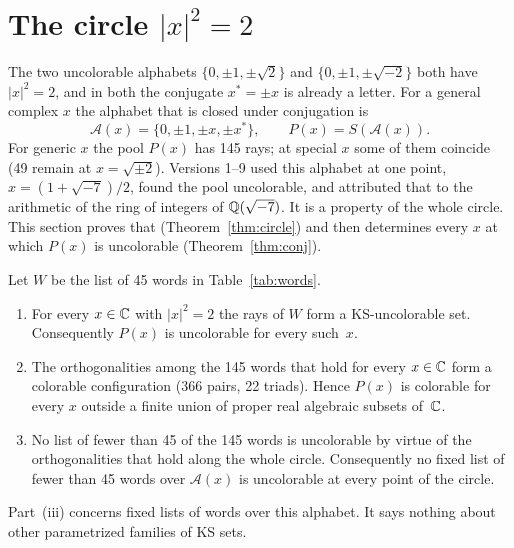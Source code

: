 \section{The circle $|x|^2=2$}\label{sec:circle}

The two uncolorable alphabets $\{0,\pm1,\pm\sqrt2\}$ and $\{0,\pm1,\pm\sqrt{-2}\}$ both have
$|x|^2=2$, and in both the conjugate $x^{*}=\pm x$ is already a letter.  For a general complex
$x$ the alphabet that is closed under conjugation is
\[
\mathcal A(x)=\{0,\pm1,\pm x,\pm x^{*}\},\qquad P(x)=S(\mathcal A(x)).
\]
For generic $x$ the pool $P(x)$ has 145 rays; at special $x$ some of them coincide (49 remain
at $x=\sqrt{\pm2}$).  Versions 1--9 used this alphabet at one
point, $x=(1+\sqrt{-7})/2$, found the pool uncolorable, and attributed that to the arithmetic of
the ring of integers of $\mathbb{Q}(\sqrt{-7})$.  It is a property of the whole circle.  This section
proves that (Theorem~\ref{thm:circle}) and then determines every $x$ at which $P(x)$ is
uncolorable (Theorem~\ref{thm:conj}).

\begin{theorem}\label{thm:circle}
Let $W$ be the list of 45 words in Table~\ref{tab:words}.
\begin{enumerate}
\item[(i)] For every $x\in\mathbb{C}$ with $|x|^2=2$ the rays of $W$ form a KS-uncolorable set.
Consequently $P(x)$ is uncolorable for every such~$x$.
\item[(ii)] The orthogonalities among the 145 words that hold for every $x\in\mathbb{C}$ form a colorable
configuration (366 pairs, 22 triads).  Hence $P(x)$ is colorable for every $x$ outside a finite
union of proper real algebraic subsets of~$\mathbb{C}$.
\item[(iii)] No list of fewer than 45 of the 145 words is uncolorable by virtue of the
orthogonalities that hold along the whole circle.  Consequently no fixed list of fewer than 45
words over $\mathcal A(x)$ is uncolorable at every point of the circle.
\end{enumerate}
Part~(iii) concerns fixed lists of words over this alphabet.  It says nothing about other
parametrized families of KS sets.
\end{theorem}

